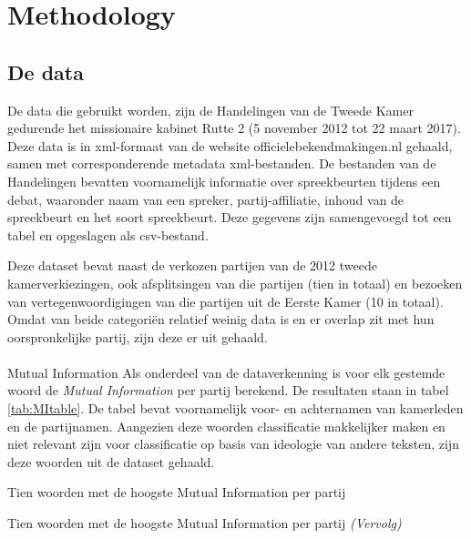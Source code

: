 \section{Methodology}
\label{sec:meth}


\subsection{De data}
De data die gebruikt worden, zijn de Handelingen van de Tweede Kamer gedurende het missionaire kabinet Rutte 2 (5 november 2012 tot 22 maart 2017). Deze data is in xml-formaat van de website officielebekendmakingen.nl gehaald, samen met corresponderende metadata xml-bestanden. De bestanden van de Handelingen bevatten voornamelijk informatie over spreekbeurten tijdens een debat, waaronder naam van een spreker, partij-affiliatie, inhoud van de spreekbeurt en het soort spreekbeurt. Deze gegevens zijn samengevoegd tot een tabel en opgeslagen als csv-bestand.\par
Deze dataset bevat naast de verkozen partijen van de 2012 tweede kamerverkiezingen, ook afsplitsingen van die partijen (tien in totaal) en bezoeken van vertegenwoordigingen van die partijen uit de Eerste Kamer (10 in totaal). Omdat van beide categori\"{e}n relatief weinig data is en er overlap zit met hun oorspronkelijke partij, zijn deze er uit gehaald.
\begin{table}[H]
\centering

\end{table}

\paragraph{}{Mutual Information}
Als onderdeel van de dataverkenning is voor elk gestemde woord de \textit{Mutual Information} per partij berekend. De resultaten staan in tabel \ref{tab:MItable}. De tabel bevat voornamelijk voor- en achternamen van kamerleden en de partijnamen. Aangezien deze woorden classificatie makkelijker maken en niet relevant zijn voor classificatie op basis van ideologie van andere teksten, zijn deze woorden uit de dataset gehaald.
\begin{table}[H]
\caption{Tien woorden met de hoogste Mutual Information per partij \protect\footnotemark }
\label{tab:MItable}
\centering

\end{table}
\addtocounter{table}{-1}
\begin{table}[H]
\caption{Tien woorden met de hoogste Mutual Information per partij \emph{(Vervolg)}}
\centering

\end{table}

